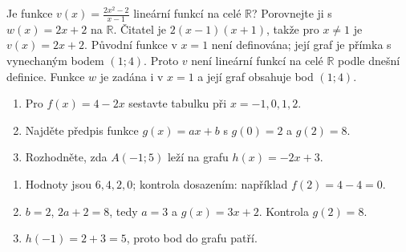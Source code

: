 \documentclass[11pt,a4paper]{article}
\begin{document}
\begin{zadaniReseniBox}
Je funkce $v(x)=\frac{2x^2-2}{x-1}$ lineární funkcí na celé $\mathbb R$? Porovnejte ji s $w(x)=2x+2$ na $\mathbb R$.
\tcblower
Čitatel je $2(x-1)(x+1)$, takže pro $x\ne1$ je $v(x)=2x+2$. Původní funkce v $x=1$ není definována; její graf je přímka s vynechaným bodem $(1;4)$. Proto $v$ není lineární funkcí na celé $\mathbb R$ podle dnešní definice. Funkce $w$ je zadána i v $x=1$ a její graf obsahuje bod $(1;4)$.
\end{zadaniReseniBox}
\begin{zadaniReseniBox}
\begin{enumerate}[label=\alph*)]
\item Pro $f(x)=4-2x$ sestavte tabulku při $x=-1,0,1,2$.
\item Najděte předpis funkce $g(x)=ax+b$ s $g(0)=2$ a $g(2)=8$.
\item Rozhodněte, zda $A(-1;5)$ leží na grafu $h(x)=-2x+3$.
\end{enumerate}
\tcblower
\begin{enumerate}[label=\alph*)]
\item Hodnoty jsou $6,4,2,0$; kontrola dosazením: například $f(2)=4-4=0$.
\item $b=2$, $2a+2=8$, tedy $a=3$ a $g(x)=3x+2$. Kontrola $g(2)=8$.
\item $h(-1)=2+3=5$, proto bod do grafu patří.
\end{enumerate}
\end{zadaniReseniBox}
\end{document}
